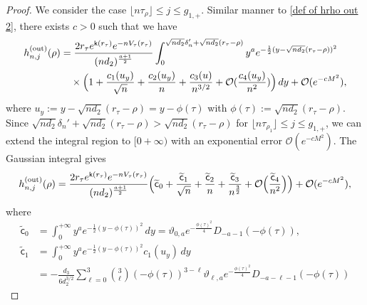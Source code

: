 \documentclass[reqno]{amsart}
\newcommand{\1}{\mathds{1}}
\numberwithin{equation}{section}
\theoremstyle{definition}
\begin{document}
\begin{proof}
We consider the case $\lfloor n\tau_{\rho}\rfloor\leq j\leq g_{1,+}$. 
Similar manner to \eqref{def of hrho out 2}, there exists $c>0$ such that we have 
\begin{align*}
h_{n,j}^{(\mathrm{out})}(\rho)
&=
\frac{2r_{\tau}e^{\mathsf{k}(r_{\tau})}e^{-nV_{\tau}(r_{\tau})}}{(nd_2)^{\frac{a+1}{2}}}
\int_{0}^{\sqrt{nd_2}\delta_n'+\sqrt{nd_2}(r_{\tau}-\rho)}
y^a
e^{-\frac{1}{2}(y-\sqrt{nd_2}(r_{\tau}-\rho))^2}
\\
&\quad\times
\Bigl( 
1+\frac{c_1(u_y)}{\sqrt{n}}+\frac{c_2(u_y)}{n}+\frac{c_3(u)}{n^{3/2}}+\mathcal{O}(\frac{c_4(u_y)}{n^2})
\Bigr)\,dy
+\mathcal{O}(e^{-cM^2}),
\end{align*}
where $u_y:=y-\sqrt{nd_2}(r_{\tau}-\rho)=y-\phi(\tau)$ with $\phi(\tau):=\sqrt{nd_2}(r_{\tau}-\rho)$. 
Since $\sqrt{nd_2}\delta_n'+\sqrt{nd_2}(r_{\tau}-\rho)>\sqrt{nd_2}(r_{\tau}-\rho)$ for $\lfloor n\tau_{\rho_1}\rfloor\leq j \leq g_{1,+}$, we can extend the integral region to $[0+\infty)$ with an exponential error $\mathcal{O}(e^{-cM^2})$. 
The Gaussian integral gives 
\begin{equation}
\label{def of hrho out second part}
h_{n,j}^{(\mathrm{out})}(\rho)
=
\frac{2r_{\tau}e^{\mathsf{k}(r_{\tau})}e^{-nV_{\tau}(r_{\tau})}}{(nd_2)^{\frac{a+1}{2}}}
\Bigl( 
\widetilde{\mathsf{c}}_0
+\frac{\widetilde{\mathsf{c}}_1}{\sqrt{n}}
+\frac{\widetilde{\mathsf{c}}_2}{n}
+\frac{\widetilde{\mathsf{c}}_3}{n^{\frac{3}{2}}}
+\mathcal{O}\Bigl(\frac{\widetilde{\mathsf{c}}_4}{n^2}\Bigr)
\Bigr)
+\mathcal{O}(e^{-cM^2}),
\end{equation}
where 
\begin{align*}
\widetilde{\mathsf{c}}_0
&=
\int_{0}^{+\infty}
y^ae^{-\frac{1}{2}(y-\phi(\tau))^2}\,dy
=
\vartheta_{0,a}
e^{-\frac{\phi(\tau)^2}{4}}D_{-a-1}(-\phi(\tau)), 
\\
\widetilde{\mathsf{c}}_1
&=\int_{0}^{+\infty}
y^ae^{-\frac{1}{2}(y-\phi(\tau))^2}c_1(u_y)\,dy
\\
&=
-\frac{d_3}{6d_2^{3/2}}
\sum_{\ell=0}^{3}\binom{3}{\ell}(-\phi(\tau))^{3-\ell}\vartheta_{\ell,a}e^{-\frac{\phi(\tau)^2}{4}}D_{-a-\ell-1}(-\phi(\tau))

\end{align*}
\end{proof}
\end{document}
